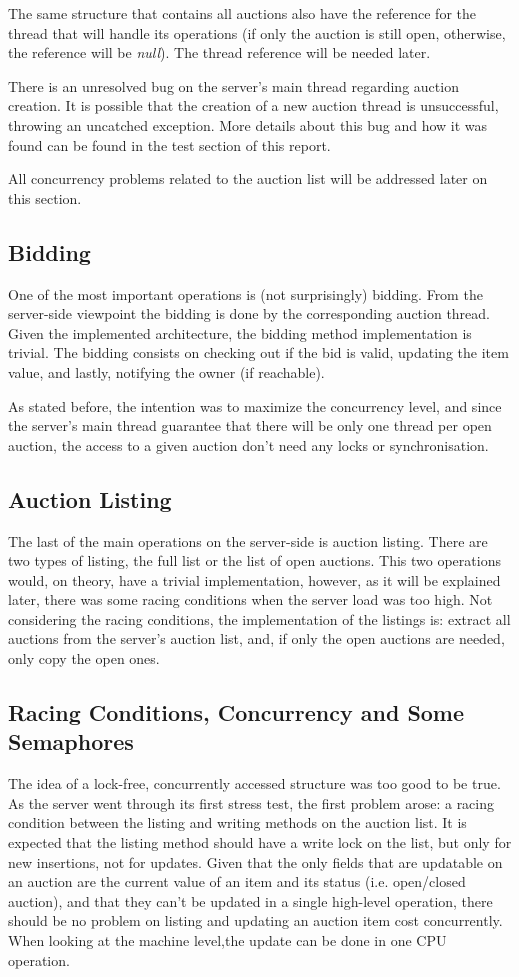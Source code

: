 \documentclass[twocolumn,10pt]{article}
\begin{document}
The same structure that contains all auctions also have the reference for the thread that will handle its operations (if only the auction is still open, otherwise, the reference will be \textit{null}). The thread reference will be needed later.

There is an unresolved bug on the server's main thread regarding auction creation. It is possible that the creation of a new auction thread is unsuccessful, throwing an uncatched exception. More details about this bug and how it was found can be found in the test section of this report.

All concurrency problems related to the auction list will be addressed later on this section.

\subsection{Bidding}
One of the most important operations is (not surprisingly) bidding. From the server-side viewpoint the bidding is done by the corresponding auction thread. Given the implemented architecture, the bidding method implementation is trivial. The bidding consists on checking out if the bid is valid, updating the item value, and lastly, notifying the owner (if reachable).

As stated before, the intention was to maximize the concurrency level, and since the server's main thread guarantee that there will be only one thread per open auction, the access to a given auction don't need any locks or synchronisation. 

\subsection{Auction Listing}
The last of the main operations on the server-side is auction listing. There are two types of listing, the full list or the list of open auctions. This two operations would, on theory, have a trivial implementation, however, as it will be explained later, there was some racing conditions when the server load was too high. Not considering the racing conditions, the implementation of the listings is: extract all auctions from the server's auction list, and, if only the open auctions are needed, only copy the open ones.

\subsection{Racing Conditions, Concurrency and Some Semaphores}
The idea of a lock-free, concurrently accessed structure was too good to be true. As the server went through its first stress test, the first problem arose: a racing condition between the listing and writing methods on the auction list. It is expected that the listing method should have a write lock on the list, but only for new insertions, not for updates. Given that the only fields that are updatable on an auction are the current value of an item and its status (i.e. open/closed auction), and that they can't be updated in a single high-level operation, there should be no problem on listing and updating an auction item cost concurrently. When looking at the machine level,the update can be done in one CPU operation.
\end{document}
